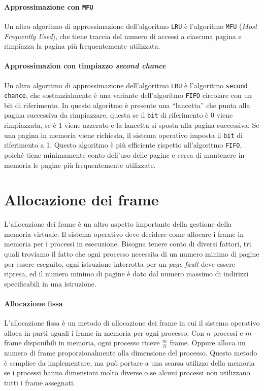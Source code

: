             \paragraph{Approssimazione con \texttt{MFU}}
                Un altro algoritmo di approssimazione dell'algoritmo \texttt{LRU} è l'algoritmo \texttt{MFU} (\textit{Most Frequently Used}), che tiene traccia del numero di accessi a ciascuna pagina e rimpiazza la pagina più frequentemente utilizzata.
            \paragraph{Approssimazion con timpiazzo \textit{second chance}}
                Un altro algoritmo di approssimazione dell'algoritmo \texttt{LRU} è l'algoritmo \texttt{second chance}, che sostanzialmente è una variante dell'algoritmo \texttt{FIFO} circolare con un bit di riferimento. In questo algoritmo è presente una ``lancetta'' che punta alla pagina successiva da rimpiazzare, questa se il \texttt{bit} di riferimento è 0 viene rimpiazzata, se è 1 viene azzerato e la lancetta si sposta alla pagina successiva. Se una pagina in memoria viene richiesta, il sistema operativo imposta il \texttt{bit} di riferimento a 1. Questo algoritmo è più efficiente rispetto all'algoritmo \texttt{FIFO}, poiché tiene minimamente conto dell'uso delle pagine e cerca di mantenere in memoria le pagine più frequentemente utilizzate.
\section{Allocazione dei frame}
    L'allocazione dei frame è un altro aspetto importante della gestione della memoria virtuale. Il sistema operativo deve decidere come allocare i frame in memoria per i processi in esecuzione. Bisogna tenere conto di diversi fattori, tri quali troviamo il fatto che ogni processo necessita di un numero minimo di pagine per essere eseguito, ogni istruzione interrotta per un \textit{page fault} deve essere ripresa, ed il numero minimo di pagine è dato dal numero massimo di indirizzi specificabili in una istruzione.
    \paragraph{Allocazione fissa}
        L'allocazione fissa è un metodo di allocazione dei frame in cui il sistema operativo alloca in parti uguali i frame in memoria per ogni processo. Con $n$ processi e $m$ frame disponibili in memoria, ogni processo riceve $\frac{m}{n}$ frame. Oppure alloca un numero di frame proporzionalmente alla dimensione del processo. Questo metodo è semplice da implementare, ma può portare a una scarsa utilizzo della memoria se i processi hanno dimensioni molto diverse o se alcuni processi non utilizzano tutti i frame assegnati.
